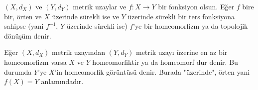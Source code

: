 \documentclass{article}
\begin{document}
\( (X, d_X) \) ve \( (Y, d_Y) \) metrik uzaylar ve \( f: X \to Y \) bir fonksiyon olsun. Eğer \( f \) bire bir, örten ve \( X \) üzerinde sürekli ise ve \( Y \) üzerinde sürekli bir ters fonksiyona sahipse (yani \( f^{-1} \), \( Y \) üzerinde sürekli ise) \( f \)'ye bir homeomorfizm ya da topolojik dönüşüm denir.

Eğer \( (X, d_X) \) metrik uzayından \( (Y, d_Y) \) metrik uzayı üzerine en az bir homeomorfizm varsa \( X \) ve \( Y \) homeomorfiktir ya da homeomorf dur denir. Bu durumda \( Y \)'ye \( X \)'in homeomorfik görüntüsü denir. Burada "üzerinde", örten yani \( f(X) = Y \) anlamındadır.
\end{document}
